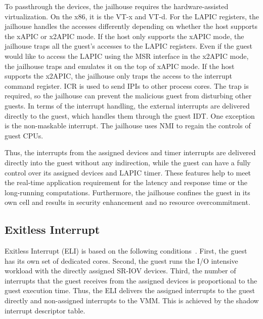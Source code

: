 {To passthrough the devices, the jailhouse requires the
hardware-assisted virtualization. On the x86, it is the VT-x
and VT-d. For the LAPIC registers, the jailhouse handles the
accesses differently depending on whether the host supports
the xAPIC or x2APIC mode. If the host only supports the xAPIC
mode, the jailhouse traps all the guest's accesses to the
LAPIC registers. Even if the guest would like to access the
LAPIC using the MSR interface in the x2APIC mode, the
jailhouse traps and emulates it on the top of xAPIC mode. If
the host supports the x2APIC, the jailhouse only traps the
access to the interrupt command register. ICR is used to send
IPIs to other process cores. The trap is required, so the
jailhouse can prevent the malicious guest from disturbing
other guests. In terms of the interrupt handling, the external
interrupts are delivered directly to the guest, which handles
them through the guest IDT. One exception is the non-maskable
interrupt. The jailhouse uses NMI to regain the controls of
guest CPUs.

Thus, the interrupts from the assigned devices and timer
interrupts are delivered directly into the guest without any
indirection, while the guest can have a fully control over its
assigned devices and LAPIC timer. These features help to meet
the real-time application requirement for the latency and
response time or the long-running computations. Furthermore,
the jailhouse confines the guest in its own cell and results
in security enhancement and no resource overcommitment.

\subsection{Exitless Interrupt}
Exitless Interrupt (ELI) is based on the following
conditions~\cite{amit:2015}. First, the guest has its own set
of dedicated cores. Second, the guest runs the I/O intensive
workload with the directly assigned SR-IOV devices. Third, the
number of interrupts that the guest receives from the assigned
devices is proportional to the guest execution time. Thus, the
ELI delivers the assigned interrupts to the guest directly and
non-assigned interrupts to the VMM. This is achieved by the
shadow interrupt descriptor table.

}
